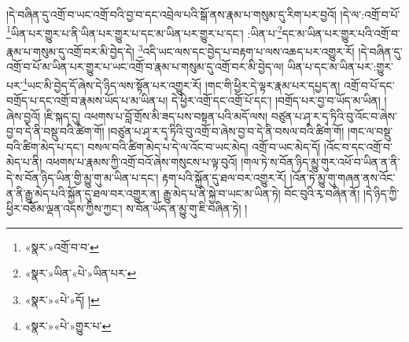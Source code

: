།དེ་བཞིན་དུ་འགྲོ་བ་ཡང་འགྲོ་བའི་བྱ་བ་དང་འབྲེལ་པའི་སྒོ་ནས་རྣམ་པ་གསུམ་དུ་རིག་པར་བྱའོ། །དེ་ལ་:འགྲོ་བ་པོ་\footnote{«སྣར་»འགྲོ་བ་བ་}ཡིན་པར་གྱུར་པ་ནི་ཡིན་པར་གྱུར་པ་དང་མ་ཡིན་པར་གྱུར་པ་དང་། :ཡིན་པ་\footnote{«སྣར་»ཡིན་«པེ་»ཡིན་པར་}དང་མ་ཡིན་པར་གྱུར་པའི་འགྲོ་བ་རྣམ་པ་གསུམ་དུ་འགྲོ་བར་མི་བྱེད་དེ། \footnote{«སྣར་»«པེ་»དོ། ། }འདི་ཡང་ལས་དང་བྱེད་པ་བརྟག་པ་ལས་འཆད་པར་འགྱུར་རོ། །དེ་བཞིན་དུ་འགྲོ་བ་པོ་མ་ཡིན་པར་གྱུར་པ་ཡང་འགྲོ་བ་རྣམ་པ་གསུམ་དུ་འགྲོ་བར་མི་བྱེད་ལ། ཡིན་པ་དང་མ་ཡིན་པར་:གྱུར་པར་\footnote{«སྣར་»«པེ་»གྱུར་པ་}ཡང་མི་བྱེད་དོ་ཞེས་དེ་ཉིད་ལས་སྟོན་པར་འགྱུར་རོ། །གང་གི་ཕྱིར་དེ་ལྟར་རྣམ་པར་དཔྱད་ན། འགྲོ་བ་པོ་དང་བགྲོད་པ་དང་འགྲོ་བ་རྣམས་ཡོད་པ་མ་ཡིན་པ། དེ་ཕྱིར་འགྲོ་དང་འགྲོ་པོ་དང་། །བགྲོད་པར་བྱ་བ་ཡོད་མ་ཡིན། །ཞེས་བྱའོ། །ཇི་སྐད་དུ། འཕགས་པ་བློ་གྲོས་མི་ཟད་པས་བསྟན་པའི་མདོ་ལས། བཙུན་པ་ཤྭ་ར་དྭ་ཏིའི་བུ་འོང་བ་ཞེས་བྱ་བ་དེ་ནི་བསྡུ་བའི་ཚིག་གོ། །བཙུན་པ་ཤྭ་ར་དྭ་ཏིའི་བུ་འགྲོ་བ་ཞེས་བྱ་བ་དེ་ནི་བསལ་བའི་ཚིག་གོ། །གང་ལ་བསྡུ་བའི་ཚིག་མེད་པ་དང་། བསལ་བའི་ཚིག་མེད་པ་དེ་ལ་འོང་བ་ཡང་མེད། འགྲོ་བ་ཡང་མེད་དོ། །འོང་བ་དང་འགྲོ་བ་མེད་པ་ནི། འཕགས་པ་རྣམས་ཀྱི་འགྲོ་བའོ་ཞེས་གསུངས་པ་ལྟ་བུའོ། །གལ་ཏེ་ས་བོན་ཉིད་མྱུ་གུར་འཕོ་བ་ཡིན་ན་ནི་དེ་ས་བོན་ཉིད་ཡིན་གྱི་མྱུ་གུ་མ་ཡིན་པ་དང་། རྟག་པའི་སྐྱོན་དུ་ཐལ་བར་འགྱུར་རོ། །འོན་ཏེ་མྱུ་གུ་གཞན་ནས་འོང་ན་ནི་རྒྱུ་མེད་པའི་སྐྱོན་དུ་ཐལ་བར་འགྱུར་ན། རྒྱུ་མེད་པ་ནི་སྐྱེ་བ་ཡང་མ་ཡིན་ཏེ། བོང་བུའི་རྭ་བཞིན་ནོ། །དེ་ཉིད་ཀྱི་ཕྱིར་བཅོམ་ལྡན་འདས་ཀྱིས་ཀྱང་། ས་བོན་ཡོད་ན་མྱུ་གུ་ཇི་བཞིན་ཏེ། །
